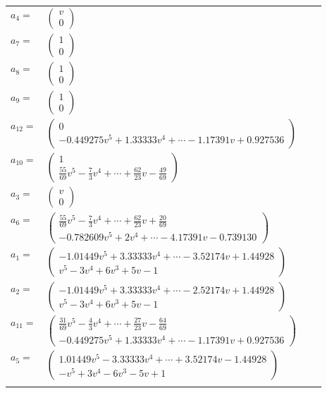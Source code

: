 \documentclass[1p]{elsarticle_modified}
\theoremstyle{definition}
\begin{document}
\begin{tabular}{m{7pt} m{180pt} m{7pt} m{180pt} }
\flushright $a_{4}=$&$\begin{pmatrix}v\\0\end{pmatrix}$ \\
\flushright $a_{7}=$&$\begin{pmatrix}1\\0\end{pmatrix}$ \\
\flushright $a_{8}=$&$\begin{pmatrix}1\\0\end{pmatrix}$ \\
\flushright $a_{9}=$&$\begin{pmatrix}1\\0\end{pmatrix}$ \\
\flushright $a_{12}=$&$\begin{pmatrix}0\\-0.449275 v^{5}+1.33333 v^{4}+\cdots-1.17391 v+0.927536\end{pmatrix}$ \\
\flushright $a_{10}=$&$\begin{pmatrix}1\\\frac{55}{69} v^5-\frac{7}{3} v^4+\cdots+\frac{62}{23} v-\frac{49}{69}\end{pmatrix}$ \\
\flushright $a_{3}=$&$\begin{pmatrix}v\\0\end{pmatrix}$ \\
\flushright $a_{6}=$&$\begin{pmatrix}\frac{55}{69} v^5-\frac{7}{3} v^4+\cdots+\frac{62}{23} v+\frac{20}{69}\\-0.782609 v^{5}+2 v^{4}+\cdots-4.17391 v-0.739130\end{pmatrix}$ \\
\flushright $a_{1}=$&$\begin{pmatrix}-1.01449 v^{5}+3.33333 v^{4}+\cdots-3.52174 v+1.44928\\v^5-3 v^4+6 v^3+5 v-1\end{pmatrix}$ \\
\flushright $a_{2}=$&$\begin{pmatrix}-1.01449 v^{5}+3.33333 v^{4}+\cdots-2.52174 v+1.44928\\v^5-3 v^4+6 v^3+5 v-1\end{pmatrix}$ \\
\flushright $a_{11}=$&$\begin{pmatrix}\frac{31}{69} v^5-\frac{4}{3} v^4+\cdots+\frac{27}{23} v-\frac{64}{69}\\-0.449275 v^{5}+1.33333 v^{4}+\cdots-1.17391 v+0.927536\end{pmatrix}$ \\
\flushright $a_{5}=$&$\begin{pmatrix}1.01449 v^{5}-3.33333 v^{4}+\cdots+3.52174 v-1.44928\\- v^5+3 v^4-6 v^3-5 v+1\end{pmatrix}$\\&\end{tabular}
\end{document}
